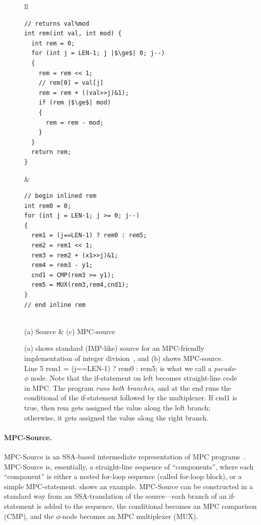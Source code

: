 \documentclass[sigconf, screen, natbib=false, dvipsnames, table]{acmart}
\theoremstyle{definition}
\begin{document}

\begin{figure}[tbhp]
\begin{tabular}{ll}
\begin{minipage}[b]{4.25cm}

\begin{verbatim}
// returns val%mod    
int rem(int val, int mod) {
  int rem = 0;
  for (int j = LEN-1; j |$\ge$| 0; j--) 
  {
    rem = rem << 1;
    // rem[0] = val[j]                                                                                                            
    rem = rem + ((val>>j)&1);   
    if (rem |$\ge$| mod) 
    {
      rem = rem - mod;
    }
  }    
  return rem;
}
\end{verbatim}
\end{minipage} 

&

\begin{minipage}[b]{4.25cm}
\begin{verbatim}
// begin inlined rem
int rem0 = 0;
for (int j = LEN-1; j >= 0; j--) 
{
  rem1 = (j==LEN-1) ? rem0 : rem5;
  rem2 = rem1 << 1;
  rem3 = rem2 + (x1>>j)&1; 
  rem4 = rem3 - y1;
  cnd1 = CMP(rem3 >= y1);
  rem5 = MUX(rem3,rem4,cnd1);
}  
// end inline rem        
\end{verbatim}
\end{minipage}
\\

(a) Source 
&
(c) MPC-source

\end{tabular}
\caption{(a) shows standard (IMP-like) source for an MPC-friendly implementation 
of integer division~\cite{Demmler}, and (b) shows MPC-source. Line 5 {\sf rem1 = (j==LEN-1) ? rem0 : rem5;} 
is what we call a {\em pseudo-$\phi$} node. Note that the {\sf if}-statement on left
becomes straight-line code in MPC. The program \emph{runs both branches}, and 
at the end runs the conditional of the if-statement followed by the multiplexer. 
If {\sf cnd1} is {\sf true}, then {\sf rem} gets assigned the value along the left branch;
otherwise, it gets assigned the value along the right branch.}
    \label{fig:example}\vspace{-2ex}
\end{figure}


\paragraph{MPC-Source.} MPC-Source is an SSA-based intermediate representation
of MPC programs~\cite{ccs paper}. MPC-Source is, essentially, a straight-line sequence
of ``components'', where each ``component'' is either a nested for-loop sequence (called for-loop block), 
or a simple MPC-statement.  shows an example. MPC-Source can be constructed
in a standard way from an SSA-translation of the source---each branch of an 
{\sf if}-statement is added to the sequence, the conditional becomes an MPC comparison (CMP), 
and the $\phi$-node becomes an MPC multiplexer (MUX). 
\end{document}
